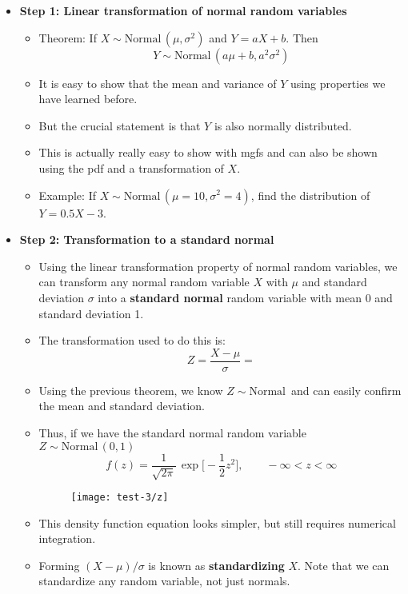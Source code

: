 \documentclass{article}
\newcommand{\follow}[1]{\sim \text{#1}\,}		%
\begin{document}
\begin{itemize}
    \item \textbf{Step 1: Linear transformation of normal random variables}\bigskip
    \begin{itemize}
        \item Theorem: If $X \follow{Normal}(\mu, \sigma^2)$ and $Y = aX + b$. Then
        \[Y \follow{Normal}(a\mu + b, a^2\sigma^2)\]
        \item It is easy to show that the mean and variance of $Y$ using properties we have learned before.
        \item But the crucial statement is that $Y$ is also normally distributed.
        \item[] This is actually really easy to show with mgfs and can also be shown using the pdf and a transformation of $X$.
        \item Example: If $X \follow{Normal}(\mu = 10, \sigma^2 = 4)$, find the distribution of $Y = 0.5X - 3$.\vspace{30pt}
    \end{itemize}\bigskip
    \item \textbf{Step 2: Transformation to a standard normal}\bigskip
    \begin{itemize}
        \item Using the linear transformation property of normal random variables, we can transform any normal random variable $X$ with $\mu$ and standard deviation $\sigma$ into a \textbf{standard normal} random variable with mean 0 and standard deviation 1.
        \item The transformation used to do this is:
        \[Z = \frac{X - \mu}{\sigma} = \]
        \item Using the previous theorem, we know $Z \follow{Normal}$ and can easily confirm the mean and standard deviation.\vspace{40pt}
        \item Thus, if we have the standard normal random variable $Z \follow{Normal}(0, 1)$
        \[f(z) = \frac{1}{\sqrt{2 \pi}} \, \exp\bigg[-\frac{1}{2} z^2 \bigg], \quad\quad -\infty < z < \infty\]
    \begin{figure}[H]
        \center\texttt{[image: test-3/z]}
    \end{figure}
        \item This density function equation looks simpler, but still requires numerical integration.
        \item Forming $(X - \mu) / \sigma$ is known as \textbf{standardizing} $X$. Note that we can standardize any random variable, not just normals.

\end{itemize}
\end{itemize}
\end{document}
